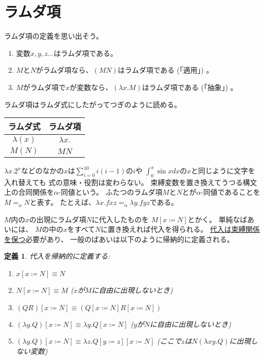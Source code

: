 \documentclass[fleqn]{jsarticle}
\newtheorem{defi}{定義}
\begin{document}
\section{ラムダ項}


ラムダ項の定義を思い出そう。

\begin{enumerate}
    \item 変数$x, y, z \ldots$はラムダ項である。
    \item $M$と$N$がラムダ項なら、$(MN)$はラムダ項である (「適用」) 。
    \item $M$がラムダ項で$x$が変数なら、$(\lambda x. M)$はラムダ項である (「抽象」) 。
\end{enumerate}

ラムダ項はラムダ式にしたがってつぎのように読める。

\begin{center}
  \begin{tabular}{c|c}
   ラムダ式      & ラムダ項\\ \hline
   $\lambda (x)$ & $\lambda x.$\\
   $M(N)$        & $MN$
  \end{tabular}
\end{center}


$\lambda x. 2^x$などのなかの$x$は$\sum_{i=0}^{10} i(i-1)$の$i$や
$\int_0^{\pi} \sin x dx$の$x$と同じように文字を入れ替えても
式の意味・役割は変わらない。
束縛変数を置き換えてうつる構文上の合同関係を$\alpha$-同値という。
ふたつのラムダ項$M$と$N$とが$\alpha$-同値であることを
$M =_{\alpha} N$と表す。
たとえば、$\lambda x.fxz =_{\alpha} \lambda y.fyz$である。
 
$M$内の$x$の出現にラムダ項$N$に代入したものを
$M[x \coloneqq N]$とかく。
単純なばあいには、
$M$の中の$x$をすべて$N$に置き換えれば代入を得られる。
\underline{代入は束縛関係を保つ}必要があり、
一般のばあいは以下のように帰納的に定義される。


\begin{defi}
代入を帰納的に定義する:

\begin{enumerate}
  \item $x[x \coloneqq N] \equiv N$
  \item $N[x \coloneqq N] \equiv M$ ($x$が$M$に自由に出現しないとき)
  \item $(QR)[ x \coloneqq N] \equiv (Q[x \coloneqq N] R[x \coloneqq N])$
  \item $( \lambda y.Q)[x \coloneqq N] \equiv \lambda y.Q[x \coloneqq N ]$ ($y$が$N$に自由に出現しないとき)
  \item $(\lambda y.Q)[x \coloneqq N] \equiv \lambda z.Q[y \coloneqq z][x \coloneqq N]$ (ここで$z$は$N(\lambda xy.Q)$に出現しない変数)
\end{enumerate}
\end{defi}
\end{document}
